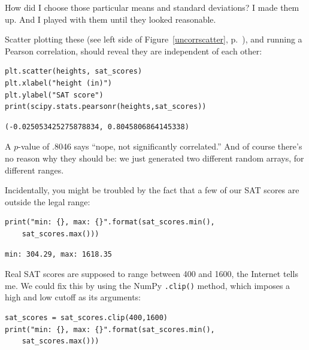
How did I choose those particular means and standard deviations? I made them
up. And I played with them until they looked reasonable.

Scatter plotting these (see left side of Figure~\ref{uncorrscatter},
p.~\pageref{uncorrscatter}), and running a Pearson correlation, should reveal
they are independent of each other:

\begin{Verbatim}[fontsize=\small,samepage=true,frame=single,framesep=3mm]
plt.scatter(heights, sat_scores)
plt.xlabel("height (in)")
plt.ylabel("SAT score")
print(scipy.stats.pearsonr(heights,sat_scores))
\end{Verbatim}
\vspace{-.2in}

\begin{Verbatim}[fontsize=\small,samepage=true,frame=leftline,framesep=5mm,framerule=1mm]
(-0.025053425275878834, 0.8045806864145338)
\end{Verbatim}

A $p$-value of .8046 says ``nope, not significantly correlated.'' And of course
there's no reason why they should be: we just generated two different random
arrays, for different ranges.

Incidentally, you might be troubled by the fact that a few of our SAT scores
are outside the legal range:

\begin{Verbatim}[fontsize=\small,samepage=true,frame=single,framesep=3mm]
print("min: {}, max: {}".format(sat_scores.min(),
    sat_scores.max()))
\end{Verbatim}
\vspace{-.2in}

\begin{Verbatim}[fontsize=\small,samepage=true,frame=leftline,framesep=5mm,framerule=1mm]
min: 304.29, max: 1618.35
\end{Verbatim}


Real SAT scores are supposed to range between 400 and 1600, the Internet tells
me. We could fix this by using the NumPy \texttt{.clip()} method, which imposes
a high and low cutoff as its arguments:

\begin{Verbatim}[fontsize=\small,samepage=true,frame=single,framesep=3mm]
sat_scores = sat_scores.clip(400,1600)
print("min: {}, max: {}".format(sat_scores.min(),
    sat_scores.max()))
\end{Verbatim}
\vspace{-.2in}

